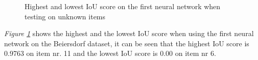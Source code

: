 \begin{figure}[h]
 \centering
 \hfill
 
 \caption{Highest and lowest IoU score on the first neural network when testing on unknown items}
 \label{fig:v1unknowniou}
\end{figure}
\textit{Figure \ref{fig:v1unknowniou}} shows the highest and the lowest IoU score when using the first neural network on the Beiersdorf dataset, it can be seen that the highest IoU score is 0.9763 on item nr. 11 and the lowest IoU score is 0.00 on item nr 6.

